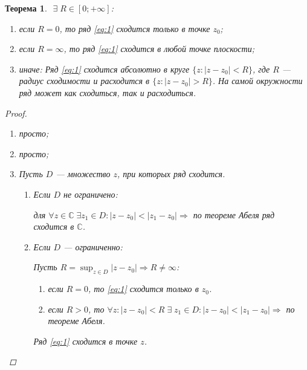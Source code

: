 \documentclass[a4paper,12pt]{article}
\newtheorem*{theorem}{Теорема}
\theoremstyle{remark}
\theoremstyle{definition}
\begin{document}
\begin{theorem} \(\)
    \(\exists\; R \in [0; +\infty]\):
    \begin{enumerate}
        \item если \(R = 0\), то ряд \eqref{eq:1} сходится только в точке \(z_0\);
        \item если \(R = \infty\), то ряд \eqref{eq:1} сходится в любой точке плоскости;
        \item иначе: Ряд \eqref{eq:1} сходится абсолютно в круге \(\{z: |z - z_0| < R\}\), где \(R\) --- радиус сходимости и расходится в \(\{z: |z - z_0| > R\}\). На самой окружности ряд может как сходиться, так и расходиться. 
    \end{enumerate}

    \begin{proof} \(\)
        \begin{enumerate}
            \item просто;
            \item просто;
            \item Пусть \(D\) --- множество \(z\), при которых ряд сходится. 
            \begin{enumerate}
                \item Если \(D\) не ограничено: 

                для \(\forall z \in \mathbb{C} \;\exists z_1 \in D: |z - z_0| < |z_1 - z_0| \Rightarrow\) по теореме Абеля ряд сходится в \(\mathbb{C}\).
                \item Если \(D\) --- ограниченно:

                Пусть \(R = \sup_{z \in D} |z - z_0| \Rightarrow R \neq \infty\):

                \begin{enumerate}
                    \item если \(R = 0\), то \eqref{eq:1} сходится только в \(z_0\).
                    \item если \(R > 0\), то \(\forall z: |z - z_0| < R \;\exists\; z_1 \in D: |z - z_0| < |z_1 - z_0| \Rightarrow\) по теореме Абеля.
                \end{enumerate}
                Ряд \eqref{eq:1} сходится в точке \(z\).
            \end{enumerate}
            

        \end{enumerate}
    \end{proof}
\end{theorem}
\end{document}
